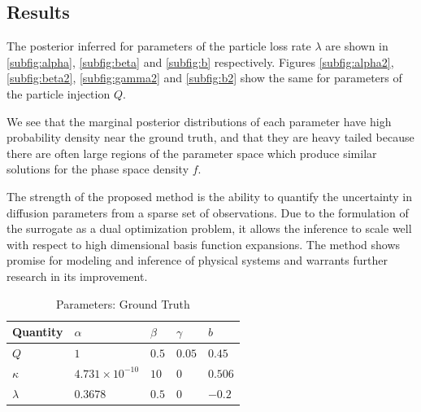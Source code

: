 \documentclass{article}
\begin{document}
\subsection*{Results}

The posterior inferred for parameters of the particle loss rate $\lambda$ are shown in
\ref{subfig:alpha}, \ref{subfig:beta} and \ref{subfig:b} respectively. Figures \ref{subfig:alpha2}, 
\ref{subfig:beta2}, \ref{subfig:gamma2} and \ref{subfig:b2} show the same for parameters of the
particle injection $Q$.

We see that the marginal posterior distributions of each parameter have high probability 
density near the ground truth, and that they are heavy tailed because there are often large 
regions of the parameter space which produce similar solutions for the phase space density $f$. 

The strength of the proposed method is the ability to quantify the uncertainty in diffusion parameters from a sparse
set of observations. Due to the formulation of the surrogate as a dual optimization problem, it allows the inference
to scale well with respect to high dimensional basis function expansions. The method shows promise for modeling and inference of physical systems and warrants further research in its improvement.




\begin{table}[t]
  \caption{Parameters: Ground Truth}
  \label{tab:ground-truth}
  \centering
  \begin{tabular}{lllll}
    \toprule
    \cmidrule{1-2}
    Quantity     & $\alpha$     & $\beta$ & $\gamma$ & $b$ \\
    \midrule
    $Q$ & $1$  & $0.5$ & $0.05$  & $0.45$     \\
    $\kappa$  & $4.731 \times 10^{-10}$ & $10$  & $0$ & $0.506$ \\
    $\lambda$ & $0.3678$ & $0.5$  & $0$ & $-0.2$ \\
    \bottomrule
  \end{tabular}
\end{table}
\end{document}
